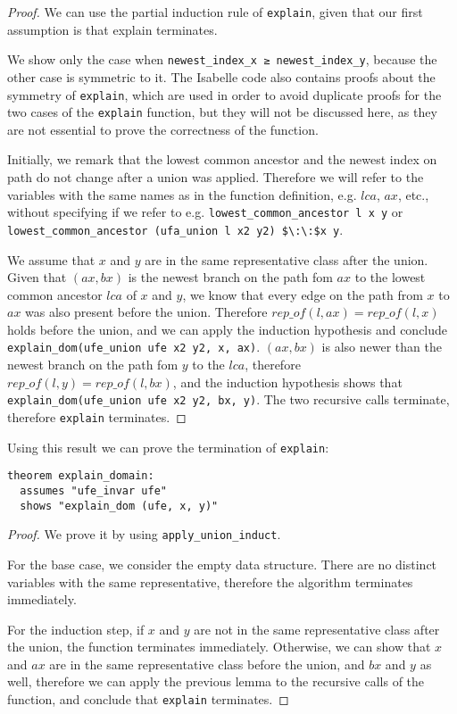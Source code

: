 \begin{proof}
We can use the partial induction rule of \lstinline|explain|, given that our first assumption is that explain terminates.

We show only the case when \lstinline|newest_index_x ≥ newest_index_y|, because the other case is symmetric to it. The Isabelle code also contains proofs about the symmetry of \lstinline{explain}, which are used in order to avoid duplicate proofs for the two cases of the \lstinline{explain} function, but they will not be discussed here, as they are not essential to prove the correctness of the function.

Initially, we remark that the lowest common ancestor and the newest index on path do not change after a union was applied. Therefore we will refer to the variables with the same names as in the function definition, e.g. $lca$, $ax$, etc., without specifying if we refer to e.g. \lstinline|lowest_common_ancestor l x y| or \lstinline|lowest_common_ancestor (ufa_union l x2 y2) $\:\:$x y|.

We assume that $x$ and $y$ are in the same representative class after the union. Given that $(ax, bx)$ is the newest branch on the path fom $ax$ to the lowest common ancestor $lca$ of $x$ and $y$, we know that every edge on the path from $x$ to $ax$ was also present before the union. Therefore $rep\_of(l, ax) = rep\_of(l, x)$ holds before the union, and we can apply the induction hypothesis and conclude \lstinline|explain_dom(ufe_union ufe x2 y2, x, ax)|. $(ax, bx)$ is also newer than the newest branch on the path fom $y$ to the $lca$, therefore $rep\_of(l, y) = rep\_of(l, bx)$, and the induction hypothesis shows that \lstinline|explain_dom(ufe_union ufe x2 y2, bx, y)|. The two recursive calls terminate, therefore \lstinline|explain| terminates.
\end{proof}

Using this result we can prove the termination of \lstinline|explain|:

\begin{lstlisting}
theorem explain_domain:
  assumes "ufe_invar ufe"
  shows "explain_dom (ufe, x, y)"
\end{lstlisting}

\begin{proof}
We prove it by using \lstinline|apply_union_induct|.

For the base case, we consider the empty data structure. There are no distinct variables with the same representative, therefore the algorithm terminates immediately.

For the induction step, if $x$ and $y$ are not in the same representative class after the union, the function terminates immediately. Otherwise, we can show that $x$ and $ax$ are in the same representative class before the union, and $bx$ and $y$ as well, therefore we can apply the previous lemma to the recursive calls of the function, and conclude that \lstinline|explain| terminates.
\end{proof}

